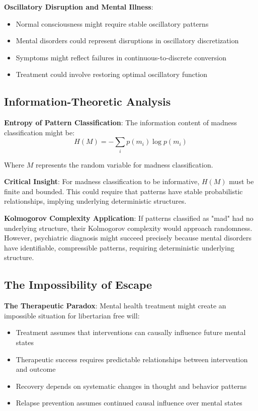 \documentclass[12pt]{article}
\begin{document}
{\textbf{Oscillatory Disruption and Mental Illness}:
\begin{itemize}
\item Normal consciousness might require stable oscillatory patterns
\item Mental disorders could represent disruptions in oscillatory discretization
\item Symptoms might reflect failures in continuous-to-discrete conversion
\item Treatment could involve restoring optimal oscillatory function
\end{itemize}

\subsection{Information-Theoretic Analysis}

\textbf{Entropy of Pattern Classification}: The information content of madness classification might be:
$$H(M) = -\sum_i p(m_i) \log p(m_i)$$

Where $M$ represents the random variable for madness classification.

\textbf{Critical Insight}: For madness classification to be informative, $H(M)$ must be finite and bounded. This could require that patterns have stable probabilistic relationships, implying underlying deterministic structures.

\textbf{Kolmogorov Complexity Application}: If patterns classified as "mad" had no underlying structure, their Kolmogorov complexity would approach randomness. However, psychiatric diagnosis might succeed precisely because mental disorders have identifiable, compressible patterns, requiring deterministic underlying structure.

\subsection{The Impossibility of Escape}

\textbf{The Therapeutic Paradox}: Mental health treatment might create an impossible situation for libertarian free will:
\begin{itemize}
\item Treatment assumes that interventions can causally influence future mental states
\item Therapeutic success requires predictable relationships between intervention and outcome
\item Recovery depends on systematic changes in thought and behavior patterns
\item Relapse prevention assumes continued causal influence over mental states
\end{itemize}

}
\end{document}
